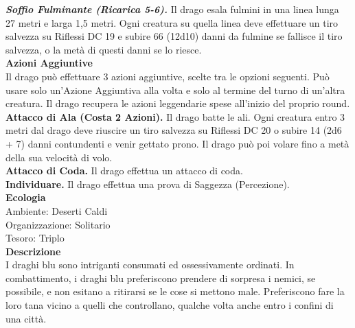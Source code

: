 \begin{multicols}{2}
\emph{\textbf{Soffio Fulminante (Ricarica 5-6).}} Il drago esala fulmini in una linea lunga 27 metri e larga 1,5 metri. Ogni creatura su quella linea deve effettuare un tiro salvezza su Riflessi DC 19 e subire 66 (12d10) danni da fulmine se fallisce il tiro salvezza, o la metà di questi danni se lo riesce.\\
\textbf{Azioni Aggiuntive}\\
Il drago può effettuare 3 azioni aggiuntive, scelte tra le opzioni seguenti. Può usare solo un'Azione Aggiuntiva alla volta e solo al termine del turno di un'altra creatura. Il drago recupera le azioni leggendarie spese all'inizio del proprio round.\\
\textbf{Attacco di Ala (Costa 2 Azioni).} Il drago batte le ali. Ogni creatura entro 3 metri dal drago deve riuscire un tiro salvezza su Riflessi DC 20 o subire 14 (2d6 + 7) danni contundenti e venir gettato prono. Il drago può poi volare fino a metà della sua velocità di volo.\\
\textbf{Attacco di Coda.} Il drago effettua un attacco di coda.\\
\textbf{Individuare.} Il drago effettua una prova di Saggezza (Percezione).\\
\textbf{Ecologia}\\
Ambiente: Deserti Caldi\\
Organizzazione: Solitario\\
Tesoro: Triplo\\
\textbf{Descrizione}\\
I draghi blu sono intriganti consumati ed ossessivamente ordinati. In combattimento, i draghi blu preferiscono prendere di sorpresa i nemici, se possibile, e non esitano a ritirarsi se le cose si mettono male. Preferiscono fare la loro tana vicino a quelli che controllano, qualche volta anche entro i confini di una città.\\


\end{multicols}
